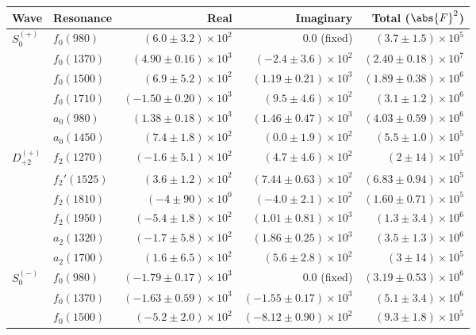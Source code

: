 \begin{table}[ht]
    \begin{center}
        \begin{tabular}{llrrr}\toprule
        Wave & Resonance & Real & Imaginary & Total ($\abs{F}^2$) \\\midrule
$S_{0}^{(+)}$ & $f_{0}(980)$ & $(6.0 \pm 3.2) \times 10^{2}$ & $0.0$ (fixed) & $(3.7 \pm 1.5) \times 10^{5}$ \\
 & $f_{0}(1370)$ & $(4.90 \pm 0.16) \times 10^{3}$ & $(-2.4 \pm 3.6) \times 10^{2}$ & $(2.40 \pm 0.18) \times 10^{7}$ \\
 & $f_{0}(1500)$ & $(6.9 \pm 5.2) \times 10^{2}$ & $(1.19 \pm 0.21) \times 10^{3}$ & $(1.89 \pm 0.38) \times 10^{6}$ \\
 & $f_{0}(1710)$ & $(-1.50 \pm 0.20) \times 10^{3}$ & $(9.5 \pm 4.6) \times 10^{2}$ & $(3.1 \pm 1.2) \times 10^{6}$ \\
 & $a_{0}(980)$ & $(1.38 \pm 0.18) \times 10^{3}$ & $(1.46 \pm 0.47) \times 10^{3}$ & $(4.03 \pm 0.59) \times 10^{6}$ \\
 & $a_{0}(1450)$ & $(7.4 \pm 1.8) \times 10^{2}$ & $(0.0 \pm 1.9) \times 10^{2}$ & $(5.5 \pm 1.0) \times 10^{5}$ \\
$D_{+2}^{(+)}$ & $f_{2}(1270)$ & $(-1.6 \pm 5.1) \times 10^{2}$ & $(4.7 \pm 4.6) \times 10^{2}$ & $(2 \pm 14) \times 10^{5}$ \\
 & $f_{2}'(1525)$ & $(3.6 \pm 1.2) \times 10^{2}$ & $(7.44 \pm 0.63) \times 10^{2}$ & $(6.83 \pm 0.94) \times 10^{5}$ \\
 & $f_{2}(1810)$ & $(-4 \pm 90) \times 10^{0}$ & $(-4.0 \pm 2.1) \times 10^{2}$ & $(1.60 \pm 0.71) \times 10^{5}$ \\
 & $f_{2}(1950)$ & $(-5.4 \pm 1.8) \times 10^{2}$ & $(1.01 \pm 0.81) \times 10^{3}$ & $(1.3 \pm 3.4) \times 10^{6}$ \\
 & $a_{2}(1320)$ & $(-1.7 \pm 5.8) \times 10^{2}$ & $(1.86 \pm 0.25) \times 10^{3}$ & $(3.5 \pm 1.3) \times 10^{6}$ \\
 & $a_{2}(1700)$ & $(1.6 \pm 6.5) \times 10^{2}$ & $(5.6 \pm 2.8) \times 10^{2}$ & $(3 \pm 14) \times 10^{5}$ \\
$S_{0}^{(-)}$ & $f_{0}(980)$ & $(-1.79 \pm 0.17) \times 10^{3}$ & $0.0$ (fixed) & $(3.19 \pm 0.53) \times 10^{6}$ \\
 & $f_{0}(1370)$ & $(-1.63 \pm 0.59) \times 10^{3}$ & $(-1.55 \pm 0.17) \times 10^{3}$ & $(5.1 \pm 3.4) \times 10^{6}$ \\
 & $f_{0}(1500)$ & $(-5.2 \pm 2.0) \times 10^{2}$ & $(-8.12 \pm 0.90) \times 10^{2}$ & $(9.3 \pm 1.8) \times 10^{5}$ \\

\end{tabular}
\end{center}
\end{table}
